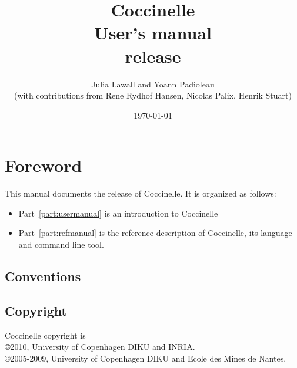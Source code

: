 \documentclass{report}
\begin{document}
\date{}

\title{
{\Huge \bf Coccinelle}\\
{User's manual}\\
{release \cocciversion}\\
}

\author{
Julia Lawall and Yoann Padioleau \\
{(with contributions from
Rene Rydhof Hansen,
Nicolas Palix,
Henrik Stuart)
}
}

\date{\today}

\maketitle
\tableofcontents


\chapter*{Foreword}

This manual documents the release \cocciversion of Coccinelle.
It is organized as follows:
\begin{itemize}
  \item Part~\ref{part:usermanual} is an introduction to Coccinelle
  \item Part~\ref{part:refmanual} is the reference description
    of Coccinelle, its language and command line tool.
\end{itemize}

\section*{Conventions}

\section*{Copyright}

Coccinelle copyright is\\
\copyright 2010, University of Copenhagen DIKU and INRIA.\\
\copyright 2005-2009, University of Copenhagen DIKU and Ecole des Mines de Nantes.
\end{document}
